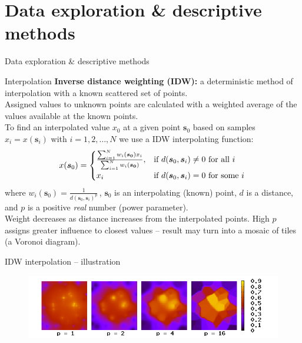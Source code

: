 \documentclass{beamer}
\begin{document}
\section{Data exploration \& descriptive methods}
\begin{frame}{Data exploration \& descriptive methods}
\end{frame}
\begin{frame}{Interpolation}
\textbf{Inverse distance weighting (IDW):} a deterministic method of interpolation with a known scattered set of points. \\ \smallskip Assigned values to unknown points are calculated with a weighted average of the values available at the known points.
\\ \smallskip 
To find an interpolated value $x_0$ at a given point $\bm{s}_0$ based on samples $x_i=x(\bm{s}_i)$ with $i=1,2,\dots,N$ we use a IDW interpolating function:
$$
x(\bm{s}_0) = 
\begin{cases}
    \frac{\sum_{i=1}^N w_i(\bm{s_0})x_i}{\sum_{i=1}^N w_i(\bm{s_0})}, & 
    \textnormal{if~} d(\bm{s}_0,\bm{s}_i) \neq 0 \textnormal{~for all~}i\\
    x_i & \textnormal{if~} d(\bm{s}_0,\bm{s}_i)=0 \textnormal{~for some~}i \, 
\end{cases} 
$$
where $w_i(\bm{s}_0)=\frac{1}{d(\bm{s}_0,\bm{s}_i)^p}\,$, $\bm{s}_0$ is an interpolating (known) point, $d$ is a distance, and $p$ is a positive \textit{real} number (power parameter). \\ \smallskip
Weight decreases as distance increases from the interpolated points. High $p$ assigns greater influence to closest values -- result may turn into a mosaic of tiles (a Voronoi diagram). 
\end{frame}
\begin{frame}{IDW interpolation -- illustration}
\begin{figure}
	\includegraphics[width=.7\textwidth]{IMG/sp_idw.png}
\end{figure}
\end{frame}
\end{document}
